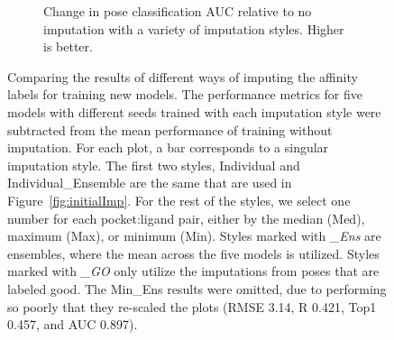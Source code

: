 \documentclass[journal=jmcmar,manuscript=article]{achemso}
\begin{document}
\begin{figure}[tbph]
\begin{subfigure}[t]{0.48\textwidth}
        \caption{Change in pose classification AUC relative to no imputation with a variety of imputation styles. Higher is better.}
    \end{subfigure}
    \caption{Comparing the results of different ways of imputing the affinity labels for training new models. The performance metrics for five models with different seeds trained with each imputation style were subtracted from the mean performance of training without imputation. For each plot, a bar corresponds to a singular imputation style. The first two styles, Individual and Individual\_Ensemble are the same that are used in Figure~\ref{fig:initialImp}. For the rest of the styles, we select one number for each pocket:ligand pair, either by the median (Med), maximum (Max), or minimum (Min). Styles marked with \textit{\_Ens} are ensembles, where the mean across the five models is utilized. Styles marked with \textit{\_GO} only utilize the imputations from poses that are labeled good. The Min\_Ens results were omitted, due to performing so poorly that they re-scaled the plots (RMSE 3.14, R 0.421, Top1 0.457, and AUC 0.897).}
    \label{fig:compareImp}
\end{figure}
\end{document}
